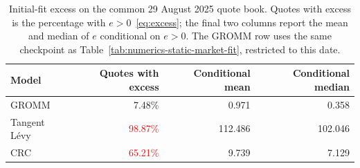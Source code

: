 \begin{table}[H]
\centering
\small
\begin{tabular}{lrrr}
\toprule
Model & Quotes with excess & Conditional mean & Conditional median\\
\midrule
GROMM & 7.48\% & 0.971 & 0.358\\
Tangent L\'evy & \textcolor{red}{98.87\%} & 112.486 & 102.046\\
CRC & \textcolor{red}{65.21\%} & 9.739 & 7.129\\
\bottomrule
\end{tabular}
\caption{Initial-fit excess on the common 29 August 2025 quote book.
Quotes with excess is the percentage with $e>0$~\eqref{eq:excess}; the final two
columns report the mean and median of $e$ conditional on $e>0$.
The GROMM row uses the same checkpoint as
Table~\ref{tab:numerics-static-market-fit}, restricted to this date.}
\label{tab:initial-fit-excess}
\end{table}
